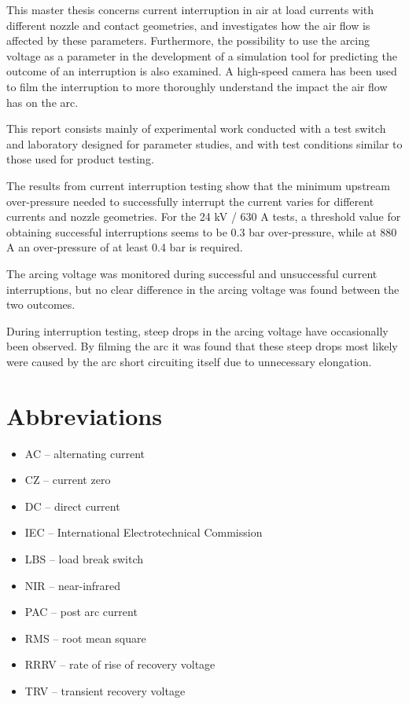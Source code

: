 \documentclass[10pt,b5paper,twoside]{article}
\begin{document}
This master thesis concerns current interruption in air at load currents with different nozzle and contact geometries, and investigates how the air flow is affected by these parameters. Furthermore, the possibility to use the arcing voltage as a parameter in the development of a simulation tool for predicting the outcome of an interruption is also examined. A high-speed camera has been used to film the interruption to more thoroughly understand the impact the air flow has on the arc.

This report consists mainly of experimental work conducted with a test switch and laboratory designed for parameter studies, and with test conditions similar to those used for product testing.

The results from current interruption testing show that the minimum upstream over-pressure needed to successfully interrupt the current varies for different currents and nozzle geometries. For the 24 kV / 630 A tests, a threshold value for obtaining successful interruptions seems to be 0.3 bar over-pressure, while at 880 A an over-pressure of at least 0.4 bar is required.

The arcing voltage was monitored during successful and unsuccessful current interruptions, but no clear difference in the arcing voltage was found between the two outcomes. 

During interruption testing, steep drops in the arcing voltage have occasionally been observed. By filming the arc it was found that these steep drops most likely were caused by the arc short circuiting itself due to unnecessary elongation.

\cleardoublepage
\setcounter{page}{1}
\tableofcontents

\cleardoublepage
\section*{Abbreviations}

\begin{itemize}
\item[] AC -- alternating current
\item[] CZ -- current zero
\item[] DC -- direct current
\item[] IEC -- International Electrotechnical Commission
\item[] LBS -- load break switch
\item[] NIR -- near-infrared
\item[] PAC -- post arc current
\item[] RMS -- root mean square
\item[] RRRV -- rate of rise of recovery voltage
\item[] TRV -- transient recovery voltage
\end{itemize}
\end{document}

